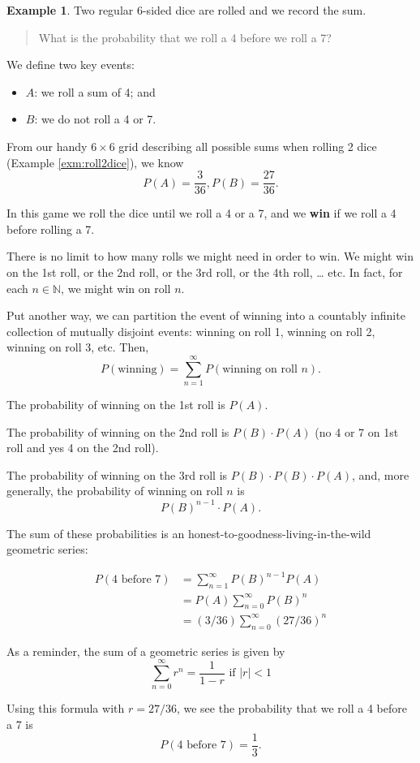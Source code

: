 \documentclass[
]{book}
\providecommand{\tightlist}{%
  \setlength{\itemsep}{0pt}\setlength{\parskip}{0pt}}
\theoremstyle{definition}
\theoremstyle{definition}
\newtheorem{example}{Example}[chapter]
\theoremstyle{definition}
\theoremstyle{definition}
\theoremstyle{remark}
\begin{document}
\begin{example}
\protect\hypertarget{exm:craps-4-before-7}{}\label{exm:craps-4-before-7}Two regular 6-sided dice are rolled and we record the sum.

\begin{quote}
What is the probability that we roll a 4 before we roll a 7?
\end{quote}

We define two key events:

\begin{itemize}
\tightlist
\item
  \(A\): we roll a sum of 4; and
\item
  \(B\): we do not roll a 4 or 7.
\end{itemize}

From our handy \(6 \times 6\) grid describing all possible sums when rolling 2 dice (Example \ref{exm:roll2dice}), we know \[P(A) = \frac{3}{36}, P(B) = \frac{27}{36}.\]

In this game we roll the dice until we roll a 4 or a 7, and we \textbf{win} if we roll a 4 before rolling a 7.

There is no limit to how many rolls we might need in order to win.
We might win on the 1st roll, or the 2nd roll, or the 3rd roll, or the 4th roll, \ldots{} etc. In fact, for each \(n \in \mathbb{N}\), we might win on roll \(n\).

Put another way, we can partition the event of winning into a countably infinite collection of mutually disjoint events: winning on roll 1, winning on roll 2, winning on roll 3, etc. Then,
\[P(\text{winning}) = \sum_{n=1}^\infty P(\text{winning on roll }n).\]

The probability of winning on the 1st roll is \(P(A)\).

The probability of winning on the 2nd roll is \(P(B) \cdot P(A)\) (no 4 or 7 on 1st roll and yes 4 on the 2nd roll).

The probability of winning on the 3rd roll is \(P(B) \cdot P(B) \cdot P(A)\), and, more generally, the probability of winning on roll \(n\) is \[P(B)^{n-1}\cdot P(A).\]

The sum of these probabilities is an honest-to-goodness-living-in-the-wild geometric series:

\begin{align*}
P(\text{4 before 7}) &= \sum_{n=1}^\infty P(B)^{n-1}P(A)\\
                     &= P(A)\sum_{n=0}^\infty P(B)^n\\
                     &= (3/36)\sum_{n=0}^\infty (27/36)^n
\end{align*}

As a reminder, the sum of a geometric series is given by
\begin{equation}
\sum_{n=0}^\infty r^n = \frac{1}{1-r} \text{ if } |r| < 1
\label{eq:geometric-series}
\end{equation}

Using this formula with \(r = 27/36\), we see the probability that we roll a 4 before a 7 is \[P(\text{4 before 7}) = \frac{1}{3}.\]
\end{example}
\end{document}
